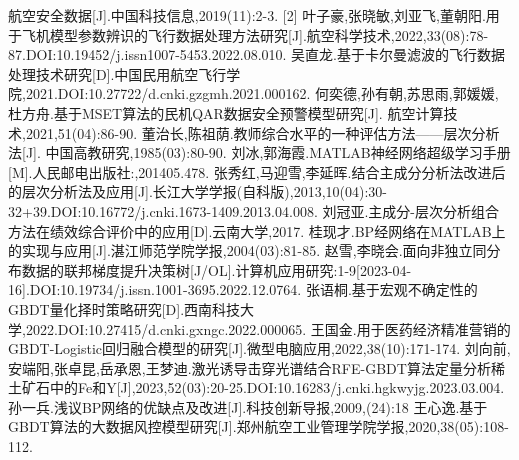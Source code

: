 \documentclass[UTF8]{ctexart}
\begin{document}
\begin{thebibliography}{40}
	航空安全数据[J].中国科技信息,2019(11):2-3. 
		叶子豪,张晓敏,刘亚飞,董朝阳.用于飞机模型参数辨识的飞行数据处理方法研究[J].航空科学技术,2022,33(08):78-87.DOI:10.19452/j.issn1007-5453.2022.08.010. 
	吴直龙.基于卡尔曼滤波的飞行数据处理技术研究[D].中国民用航空飞行学院,2021.DOI:10.27722/d.cnki.gzgmh.2021.000162. 
	何奕德,孙有朝,苏思雨,郭媛媛,杜方舟.基于MSET算法的民机QAR数据安全预警模型研究[J]. 航空计算技术,2021,51(04):86-90. 
	董治长,陈祖荫.教师综合水平的一种评估方法——层次分析法[J]. 中国高教研究,1985(03):80-90. 
	刘冰,郭海霞.MATLAB神经网络超级学习手册[M].人民邮电出版社:,201405.478. 
	张秀红,马迎雪,李延晖.结合主成分分析法改进后的层次分析法及应用[J].长江大学学报(自科版),2013,10(04):30-32+39.DOI:10.16772/j.cnki.1673-1409.2013.04.008. 
	刘冠亚.主成分-层次分析组合方法在绩效综合评价中的应用[D].云南大学,2017.
	桂现才.BP经网络在MATLAB上的实现与应用[J].湛江师范学院学报,2004(03):81-85. 
	赵雪,李晓会.面向非独立同分布数据的联邦梯度提升决策树[J/OL].计算机应用研究:1-9[2023-04-16].DOI:10.19734/j.issn.1001-3695.2022.12.0764. 
	张语桐.基于宏观不确定性的GBDT量化择时策略研究[D].西南科技大学,2022.DOI:10.27415/d.cnki.gxngc.2022.000065. 
	王国金.用于医药经济精准营销的GBDT-Logistic回归融合模型的研究[J].微型电脑应用,2022,38(10):171-174. 
	刘向前,安端阳,张卓昆,岳承恩,王梦迪.激光诱导击穿光谱结合RFE-GBDT算法定量分析稀土矿石中的Fe和Y[J],2023,52(03):20-25.DOI:10.16283/j.cnki.hgkwyjg.2023.03.004. 
	孙一兵.浅议BP网络的优缺点及改进[J].科技创新导报,2009,(24):18 
	王心逸.基于GBDT算法的大数据风控模型研究[J].郑州航空工业管理学院学报,2020,38(05):108-112. 
	
\end{thebibliography}
\newpage
{}	%
\end{document}
